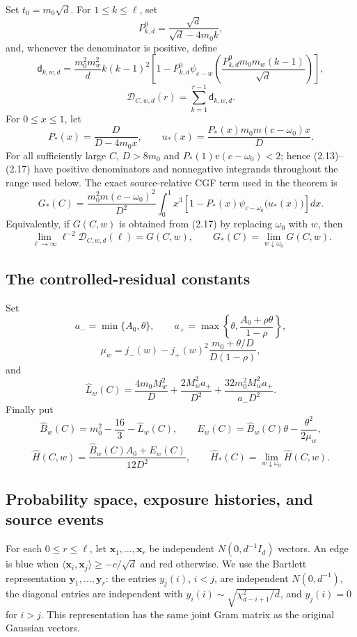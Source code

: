 Set \(t_0=m_0\sqrt d\).  For \(1\le k\le\ell\), set
\[
 P^0_{k,d}=\frac{\sqrt d}{\sqrt d-4m_0k},
\tag{2.13}
\]
and, whenever the denominator is positive, define
\[
 \mathsf d_{k,w,d}=
 \frac{m_0^2m_w^2}{d}k(k-1)^2
 \left[1-P^0_{k,d}\psi_{c-w}\!\left(
 \frac{P^0_{k,d}m_0m_w(k-1)}{\sqrt d}\right)\right],
\tag{2.14}
\]
\[
 \mathcal D_{C,w,d}(r)=\sum_{k=1}^{r-1}\mathsf d_{k,w,d}.
\tag{2.15}
\]
For \(0\le x\le1\), let
\[
 P_*(x)=\frac D{D-4m_0x},\qquad
 u_*(x)=\frac{P_*(x)m_0m(c-\omega_0)x}{D}.
\tag{2.16}
\]
For all sufficiently large \(C\), \(D>8m_0\) and
\(P_*(1)v(c-\omega_0)<2\); hence (2.13)--(2.17) have positive
denominators and nonnegative integrands throughout the range used below.
The exact source-relative CGF term used in the theorem is
\[
 G_*(C)=\frac{m_0^2m(c-\omega_0)^2}{D^2}
 \int_0^1x^3\left[1-P_*(x)
 \psi_{c-\omega_0}\bigl(u_*(x)\bigr)\right]dx.
\tag{2.17}
\]
Equivalently, if \(G(C,w)\) is obtained from (2.17) by replacing
\(\omega_0\) with \(w\), then
\[
 \lim_{\ell\to\infty}\ell^{-2}\mathcal D_{C,w,d}(\ell)=G(C,w),
 \qquad G_*(C)=\lim_{w\downarrow\omega_0}G(C,w).
\tag{2.18}
\]

\subsection{The controlled-residual constants}

Set
\[
 a_- =\min\{A_0,\theta\},\qquad
 a_+=\max\left\{\theta,
 \frac{A_0+\rho\theta}{1-\rho}\right\},
\tag{2.19}
\]
\[
 \mu_w=j_-(w)-j_+(w)^2
 \frac{m_0+\theta/D}{D(1-\rho)},
\tag{2.20}\label{eq:mu-w}
\]
and
\[
 \widehat L_w(C)=
 \frac{4m_0M_w^2}{D}
 +\frac{2M_w^2a_+}{D^2}
 +\frac{32m_0^2M_w^2a_+}{a_-D^2}.
\tag{2.21}
\]
Finally put
\[
 \widehat B_w(C)=m_0^2-\frac{16}{3}-\widehat L_w(C),
 \qquad
 E_w(C)=\widehat B_w(C)\theta-\frac{\theta^2}{2\mu_w},
\tag{2.22}
\]
\[
 \widehat H(C,w)=
 \frac{\widehat B_w(C)A_0+E_w(C)}{12D^2},
 \qquad
 \widehat H_*(C)=\lim_{w\downarrow\omega_0}\widehat H(C,w).
\tag{2.23}
\]

\subsection{Probability space, exposure histories, and source events}

For each \(0\le r\le\ell\), let
\(\boldsymbol x_1,\ldots,\boldsymbol x_r\) be independent
\(N(0,d^{-1}I_d)\) vectors.  An edge is blue when
\(\langle\boldsymbol x_i,\boldsymbol x_j\rangle\ge-c/\sqrt d\) and red
otherwise.  We use the Bartlett representation
\(\boldsymbol y_1,\ldots,\boldsymbol y_r\): the entries
\(y_j(i)\), \(i<j\), are independent \(N(0,d^{-1})\), the diagonal
entries are independent with
\(y_i(i)\sim\sqrt{\chi^2_{d-i+1}/d}\), and \(y_j(i)=0\) for \(i>j\).
This representation has the same joint Gram matrix as the original Gaussian
vectors.

